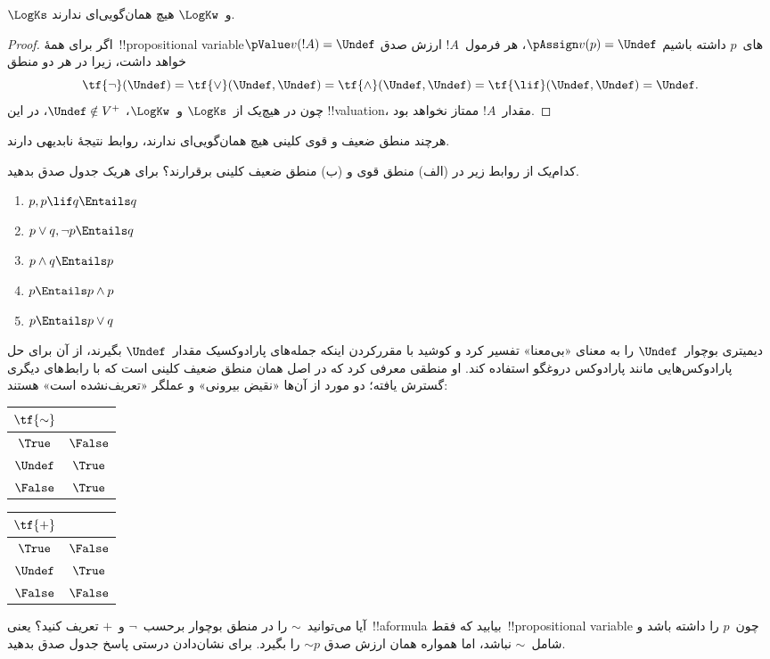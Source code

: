 \documentclass[../../../include/open-logic-section]{subfiles}
\begin{document}
\begin{prop}
  $\LogKs$ و~$\LogKw$ هیچ همان‌گویی‌ای ندارند.
\end{prop}

\begin{proof}
  اگر برای همهٔ~!!{propositional variable}های~$p$ داشته باشیم
  $\pAssign v(p) = \Undef$، هر فرمول~$!A$ ارزش صدق
  $\pValue v(!A) = \Undef$ خواهد داشت، زیرا در هر دو منطق
  \[
    \tf{\lnot}(\Undef) = \tf{\lor}(\Undef, \Undef) = \tf{\land}(\Undef,
  \Undef) = \tf{\lif}(\Undef, \Undef) = \Undef.
  \]
  چون در هیچ‌یک از~$\LogKs$ و~$\LogKw$، $\Undef \notin V^+$، در این
  !!{valuation}، مقدار~$!A$ ممتاز نخواهد بود.
\end{proof}

هرچند منطق ضعیف و قوی کلینی هیچ همان‌گویی‌ای ندارند، روابط نتیجهٔ
نابدیهی دارند.

\begin{prob}
  کدام‌یک از روابط زیر در (الف) منطق قوی و (ب) منطق ضعیف کلینی
  برقرارند؟ برای هریک جدول صدق بدهید.
  \begin{enumerate}
    \item $p, p \lif q \Entails q$
    \item $p \lor q, \lnot p \Entails q$
    \item $p \land q \Entails p$
    \item $p \Entails p \land p$
    \item $p \Entails p \lor q$
  \end{enumerate}
\end{prob}

دیمیتری بوچوار~$\Undef$ را به معنای «بی‌معنا» تفسیر کرد و کوشید با
مقررکردن اینکه جمله‌های پارادوکسیک مقدار~$\Undef$ بگیرند، از آن برای حل
پارادوکس‌هایی مانند پارادوکس دروغگو استفاده کند. او منطقی معرفی کرد که
در اصل همان منطق ضعیف کلینی است که با رابط‌های دیگری گسترش یافته؛ دو
مورد از آن‌ها «نقیض بیرونی» و عملگر «تعریف‌نشده است» هستند:
\begin{center}
  \begin{tabular}{c|c} 
    $\tf{\sim}$ & \\ 
    \hline  
    $\True$ & $\False$ \\ 
    $\Undef$ & $\True$ \\
    $\False$ & $\True$ 
  \end{tabular}
\quad
  \begin{tabular}{c|c} 
    $\tf{+}$ & \\ 
    \hline  
    $\True$ & $\False$ \\ 
    $\Undef$ & $\True$ \\
    $\False$ & $\False$ 
  \end{tabular}
\end{center}

\begin{prob}
  آیا می‌توانید~$\sim$ را در منطق بوچوار برحسب~$\lnot$ و~$+$ تعریف
  کنید؟ یعنی~!!a{formula} بیابید که فقط~!!{propositional variable}
  چون~$p$ را داشته باشد و شامل~$\sim$ نباشد، اما همواره همان ارزش صدق
  $\mathord{\sim}p$ را بگیرد. برای نشان‌دادن درستی پاسخ جدول صدق بدهید.
\end{prob}
\end{document}
